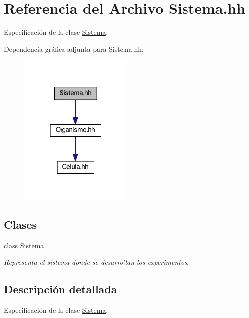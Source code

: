 \hypertarget{_sistema_8hh}{}\section{Referencia del Archivo Sistema.\+hh}
\label{_sistema_8hh}


Especificación de la clase \hyperlink{class_sistema}{Sistema}.  


Dependencia gráfica adjunta para Sistema.\+hh\+:\nopagebreak
\begin{figure}[H]
\begin{center}
\leavevmode
\includegraphics[width=157pt]{_sistema_8hh__incl}
\end{center}
\end{figure}
\subsection*{Clases}
\begin{DoxyCompactItemize}
\item 
class \hyperlink{class_sistema}{Sistema}
\begin{DoxyCompactList}\small\item\em Representa el sistema donde se desarrollan los experimentos. \end{DoxyCompactList}\end{DoxyCompactItemize}


\subsection{Descripción detallada}
Especificación de la clase \hyperlink{class_sistema}{Sistema}. 

